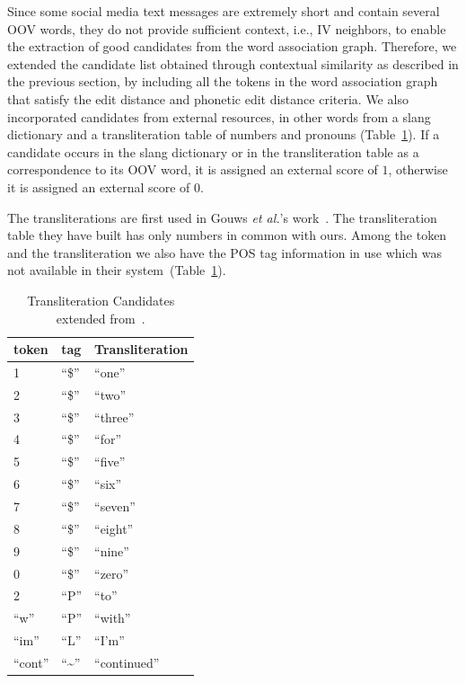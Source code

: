\documentclass[a4paper,onesided,12pt]{report}
\begin{document}
 Since some social media text messages are extremely short and contain several OOV words, they do not provide sufficient context, i.e., IV neighbors, to enable the extraction of good candidates from the word association graph. Therefore, we extended the candidate list obtained through contextual similarity as described in the previous section, by including all the tokens in the word association graph that satisfy the edit distance and phonetic edit distance criteria. We also incorporated candidates from external resources, in other words from a slang dictionary and a transliteration table of numbers and pronouns (Table~\ref{tab:transliteral}). If a candidate occurs in the slang dictionary or in the transliteration table as a correspondence to its OOV word, it is assigned an external score of $1$, otherwise it is assigned an external score of $0$.

The transliterations are first used in Gouws \textit{et al.}'s work~\cite{Gouws:2011:CBL:2021109.2021113}. The transliteration table they have built has only numbers in common with ours. Among the token and the transliteration we also have the POS tag information in use which was not available in their system~(Table~\ref{tab:transliteral}).

\begin{table}[ht]
  \caption{Transliteration Candidates extended from~\cite{Gouws:2011:CBL:2021109.2021113}.}
  \centering
    \begin{tabular}[l]{|l|l|l|}
    \hline
    \textbf{token} & \textbf{tag} & \textbf{Transliteration} \\\hline
    1 & ``\$'' & ``one'' \\\hline
    2 & ``\$'' & ``two'' \\\hline
    3 & ``\$'' & ``three'' \\\hline
    4 & ``\$'' & ``for'' \\\hline
    5 & ``\$'' & ``five'' \\\hline
    6 & ``\$'' & ``six'' \\\hline
    7 & ``\$'' & ``seven'' \\\hline
    8 & ``\$'' & ``eight'' \\\hline
    9 & ``\$'' & ``nine'' \\\hline
    0 & ``\$'' & ``zero'' \\\hline
    2 & ``P''  & ``to'' \\\hline
    ``w'' & ``P''  & ``with'' \\\hline
    ``im'' & ``L''  & ``I'm'' \\\hline
    ``cont'' & ``\textasciitilde''  & ``continued'' \\\hline
  \end{tabular}
\label{tab:transliteral}
\end{table}
\end{document}
